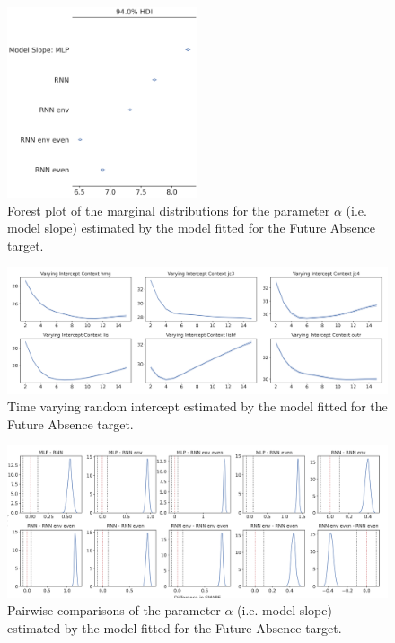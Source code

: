 \begin{figure}[H]
\centering
\includegraphics[width=0.5\textwidth]{images/appendix_C/collapsed_models_3.png}
\caption[\textbf{Targets collapsed model fixed effect}]{Forest plot of the marginal distributions for the parameter $\alpha$ (i.e. model slope) estimated by the model fitted for the Future Absence target.}
\label{model_coll_3}
\end{figure}

\begin{figure}[H]
\centering
\includegraphics[width=\textwidth]{images/appendix_C/collapsed_interc_3.png}
\caption[\textbf{Targets collapsed time-varying random intercept}]{Time varying random intercept estimated by the model fitted for the Future Absence target.}
\label{interc_coll_3}
\end{figure}

\begin{figure}[H]
\centering
\includegraphics[width=\textwidth]{images/appendix_C/collapsed_comp_3.png}
\caption[\textbf{Targets collapsed pairwise comparisons of model fixed effect}]{Pairwise comparisons of the parameter $\alpha$ (i.e. model slope) estimated by the model fitted for the Future Absence target.}
\label{comp_coll_3}
\end{figure}

